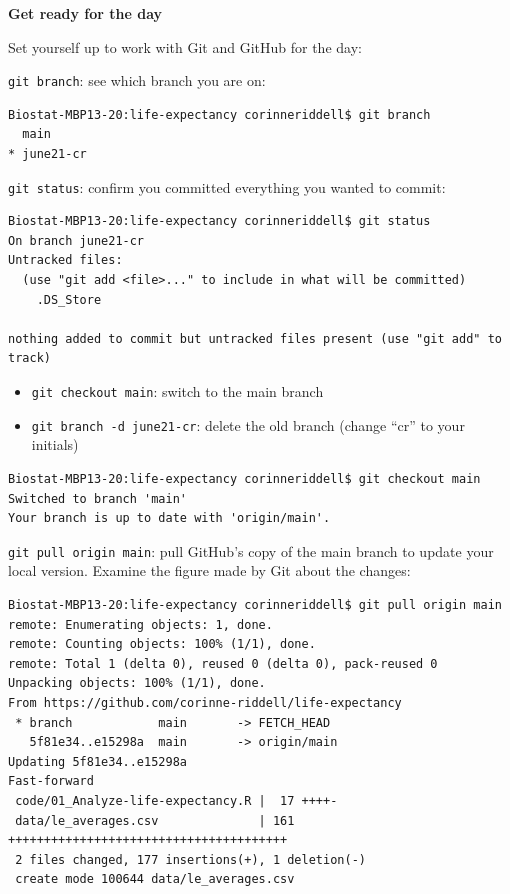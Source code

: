 \documentclass[
]{book}
\providecommand{\tightlist}{%
  \setlength{\itemsep}{0pt}\setlength{\parskip}{0pt}}
\begin{document}
\textbf{Get ready for the day}

Set yourself up to work with Git and GitHub for the day:

\texttt{git\ branch}: see which branch you are on:

\begin{verbatim}
Biostat-MBP13-20:life-expectancy corinneriddell$ git branch
  main
* june21-cr
\end{verbatim}

\texttt{git\ status}: confirm you committed everything you wanted to commit:

\begin{verbatim}
Biostat-MBP13-20:life-expectancy corinneriddell$ git status
On branch june21-cr
Untracked files:
  (use "git add <file>..." to include in what will be committed)
    .DS_Store

nothing added to commit but untracked files present (use "git add" to track)
\end{verbatim}

\begin{itemize}
\tightlist
\item
  \texttt{git\ checkout\ main}: switch to the main branch
\item
  \texttt{git\ branch\ -d\ june21-cr}: delete the old branch (change ``cr'' to your initials)
\end{itemize}

\begin{verbatim}
Biostat-MBP13-20:life-expectancy corinneriddell$ git checkout main
Switched to branch 'main'
Your branch is up to date with 'origin/main'.
\end{verbatim}

\texttt{git\ pull\ origin\ main}: pull GitHub's copy of the main branch to update your
local version. Examine the figure made by Git about the changes:

\begin{verbatim}
Biostat-MBP13-20:life-expectancy corinneriddell$ git pull origin main
remote: Enumerating objects: 1, done.
remote: Counting objects: 100% (1/1), done.
remote: Total 1 (delta 0), reused 0 (delta 0), pack-reused 0
Unpacking objects: 100% (1/1), done.
From https://github.com/corinne-riddell/life-expectancy
 * branch            main       -> FETCH_HEAD
   5f81e34..e15298a  main       -> origin/main
Updating 5f81e34..e15298a
Fast-forward
 code/01_Analyze-life-expectancy.R |  17 ++++-
 data/le_averages.csv              | 161 +++++++++++++++++++++++++++++++++++++++
 2 files changed, 177 insertions(+), 1 deletion(-)
 create mode 100644 data/le_averages.csv
\end{verbatim}
\end{document}
